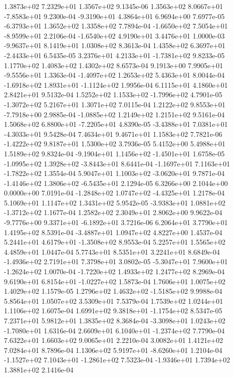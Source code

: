 1.3873e+02 7.2329e+01 1.3567e+02  9.1345e-06
 1.3563e+02  8.0667e+01 -7.8583e+01  9.2300e-04
-9.3190e+01  4.3864e+01  6.9694e+00  7.6977e-05
-6.3793e+01  1.3652e+02  1.3358e+02  7.7894e-04
-1.6650e+02  7.5054e+01 -8.9599e+01  2.2106e-04
-1.6540e+02  4.9190e+01  3.4476e+01  1.0000e-03
-9.9637e+01  8.1419e+01  1.0308e+02  8.3613e-04
 1.4358e+02  6.3697e+01 -2.4433e+01  6.5435e-05
 3.2376e+01  4.2133e+01 -1.7381e+02  9.8233e-05
1.1770e+02 1.4083e+02 1.4302e+02  8.6573e-04
 9.1913e+00  7.9905e+01 -9.5556e+01  1.3363e-04
-1.4097e+02  1.2653e+02  5.4363e+01  8.0044e-04
-1.6918e+02  1.8931e+01 -1.1124e+02  1.9956e-04
6.1115e+01 4.1860e+01 2.8421e+01  9.5132e-04
 1.5252e+02  1.1533e+02 -1.7996e+02  4.7901e-05
-1.3072e+02  5.2167e+01  1.3071e+02  7.0115e-04
 1.2122e+02  9.8553e+01 -7.7918e+00  2.9885e-04
-1.0885e+02  1.2149e+02  1.2151e+02  9.5161e-04
 1.5068e+02  6.8800e+01 -7.2205e+01  4.8390e-05
-3.4388e+01  7.0381e+01 -4.3033e+01  9.5428e-04
7.4634e+01 9.4671e+01 1.1583e+02  7.7821e-06
-1.4222e+02  9.8187e+01  1.5300e+02  3.7936e-05
5.4152e+00 5.4988e+01 1.5189e+02  9.8324e-04
-9.1904e+01  1.1456e+02 -1.4501e+01  1.6758e-05
-1.0995e+02  1.3928e+02 -3.8443e+01  8.6441e-04
-1.1697e+01  7.1163e+01 -1.7822e+02  1.3554e-04
 5.9047e+01  1.1003e+02 -3.0620e+01  9.7871e-04
-1.4146e+02  1.3806e+02 -6.5435e+01  2.1294e-05
6.3266e+00 2.1044e+00 0.0000e+00  7.0191e-04
-1.2848e+02  1.0747e+02 -4.4325e+01  1.2178e-04
5.1069e+01 1.1147e+02 1.3431e+02  5.9542e-05
-3.9383e+01  1.0881e+02 -1.3712e+02  1.1677e-04
1.2582e+02 2.3049e+01 2.8062e+00  9.9622e-04
-9.7776e+00  9.3371e+01 -6.1892e+01  3.7216e-06
6.2064e+01 3.7790e+01 1.4195e+02  8.5391e-04
-3.4887e+01  1.0947e+02  4.8227e+00  1.4537e-04
 5.2441e+01  4.6179e+01 -1.3508e+02  8.9553e-04
5.2257e+01 1.5565e+02 4.4859e+01  1.0447e-04
5.7743e+01 8.5351e+01 3.2241e+01  8.6849e-04
-1.4936e+02  2.7191e+01  7.3798e+01  3.0802e-05
-5.3047e+01  7.9600e+01 -1.2624e+02  1.0070e-04
-1.7220e+02  1.4933e+02  1.2477e+02  8.2969e-04
 9.6190e+01  6.8154e+01 -1.0227e+02  1.5873e-04
1.7606e+01 1.0075e+02 1.4029e+02  1.1579e-05
 1.2796e+02  1.4632e+02 -1.5185e+02  9.9988e-04
5.8564e+01 1.0507e+02 3.5309e+01  7.5379e-04
1.7539e+02 1.0244e+01 1.1106e+02  1.6075e-04
 1.6991e+02  9.3818e+01 -1.1754e+02  8.5347e-05
7.2371e+01 5.9812e+01 1.3835e+02  8.3684e-04
-3.3098e+01  1.0243e+02 -1.7080e+01  1.6316e-04
 2.6609e+01  6.1040e+01 -1.2374e+02  7.7790e-04
7.6322e+01 1.6603e+02 9.0065e+01  2.2210e-04
3.0082e+01 1.4121e+02 7.0284e+01  8.7896e-04
 1.1306e+02  5.9197e+01 -8.6260e+01  1.2104e-04
-1.1527e+02  7.1043e+01 -1.2861e+02  7.5323e-04
-1.9346e+01  1.7394e+02  1.3881e+02  2.1416e-04
